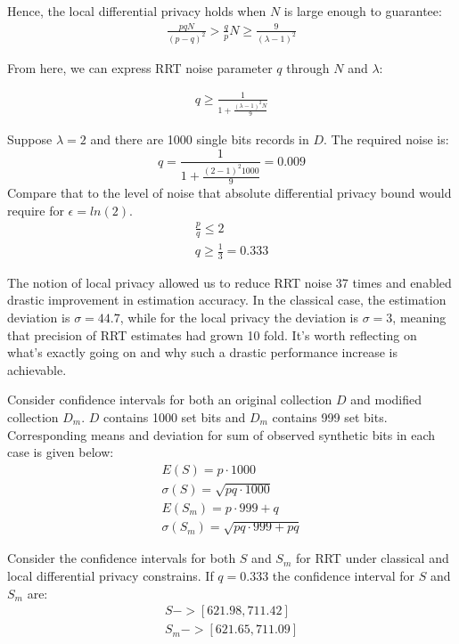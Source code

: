 \documentclass[11pt,draft]{article}
\begin{document}
Hence, the local differential privacy holds when $N$ is large enough to guarantee:
\begin{align}
\frac{pqN}{(p-q)^2} > \frac{q}{p} N \ge \frac{9}{(\lambda - 1)^2} 
\end{align}

From here, we can express RRT noise parameter $q$ through $N$ and $\lambda$:

\begin{align}
q \ge \frac{1}{1 + \frac{(\lambda - 1)^2 N}{9}} 
\end{align}

Suppose  $\lambda=2$ and there are 1000 single bits records in $D$.  The required noise is:
\[
q = \frac{1}{1 + \frac{(2 - 1)^2 1000}{9}} = 0.009
\]
Compare that to the level of noise that absolute differential privacy bound would require for $\epsilon=ln(2)$. 
\begin{align}
\frac{p}{q} \le 2 \\
q \ge \frac{1}{3} =  0.333
\end{align}

The notion of local privacy allowed us to reduce RRT noise 37 times and enabled drastic improvement in estimation accuracy.  In the classical case, the estimation deviation is $\sigma =  44.7$, while for the local privacy the deviation is $\sigma =  3$, meaning that precision of RRT estimates had grown 10 fold.  It's worth reflecting on what's  exactly going on and why such a drastic performance increase is achievable. 

Consider confidence intervals for both an original collection $D$  and modified collection $D_m$.  $D$ contains 1000 set bits and $D_m$ contains 999 set bits.  Corresponding means and deviation for sum of observed synthetic bits in each case is given below:
\begin{align}
E(S) = p \cdot 1000 \\
\sigma(S) = \sqrt{pq\cdot 1000} \\
E(S_m) = p \cdot 999 + q \\
\sigma(S_m) = \sqrt{pq\cdot 999 + pq}
\end{align}

Consider the confidence intervals for both $S$ and $S_m$ for RRT under classical and local differential privacy constrains.  If $q=0.333$ the confidence interval for $S$ and $S_m$  are:
\begin{align}
S -> [621.98 , 711.42] \\
S_m -> [621.65 , 711.09]
\end{align}
\end{document}
